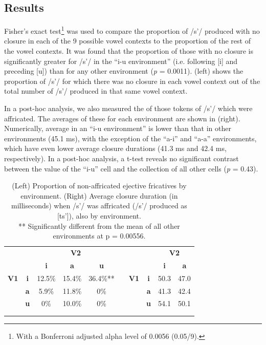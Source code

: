 \documentclass[output=paper
,newtxmath
,modfonts
,nonflat]{langsci/langscibook}
\begin{document}
\subsection{Results}\label{sec:moeng:5.3}

Fisher’s exact test\footnote{With a Bonferroni adjusted alpha level of 0.0056 (0.05/9).} was used to compare the proportion of /s’/ produced with no closure in each of the 9 possible vowel contexts to the proportion of the rest of the vowel contexts. It was found that the proportion of those with no closure is significantly greater for /s’/ in the “i-u environment” (i.e. following [i] and preceding [u]) than for any other environment (\textit{p} = 0.0011).  (left) shows the proportion of /s’/ for which there was no closure in each vowel context out of the total number of /s’/ produced in that same vowel context. 

In a post-hoc analysis, we also measured the  of those tokens of /s’/ which were affricated. The averages of these for each environment are shown in  (right). Numerically, average  in an “i-u environment” is lower than that in other environments (45.1 ms), with the exception of the “a-i” and “a-a” environments, which have even lower average closure durations (41.3 ms and 42.4 ms, respectively). In a post-hoc analysis, a t-test reveals no significant contrast between the value of the “i-u” cell and the collection of all other cells (\textit{p} = 0.43).

\begin{table}
\begin{tabular}{cc|cccccccc}
\lsptoprule
&  & \multicolumn{3}{c}{ \bfseries V2} &  &  &  & \multicolumn{2}{c}{ \bfseries V2}\\
 &  & \bfseries i & \bfseries a & \bfseries u &  &  &  & \bfseries i & \bfseries a\\
\midrule
\bfseries V1 & \bfseries i & 12.5\% & 15.4\% & 36.4\%** &  & \bfseries V1 & \bfseries i & 50.3 & 47.0\\
& \bfseries a & 5.9\% & 11.8\% & 0\% &  &  & \bfseries a & 41.3 & 42.4\\
& \bfseries u & 0\% & 10.0\% & 0\% &  &  & \bfseries u & 54.1 & 50.1\\
\\
\lspbottomrule
\end{tabular}
\caption{(Left) Proportion of non-affricated ejective fricatives by environment. (Right) Average closure duration (in milliseconds) when /s’/ was affricated (/s’/ produced as [ts’]), also by environment.\\
** Significantly different from the mean of all other environments at p = 0.00556.
}
\label{tab:moeng:2}
\end{table}
\end{document}
